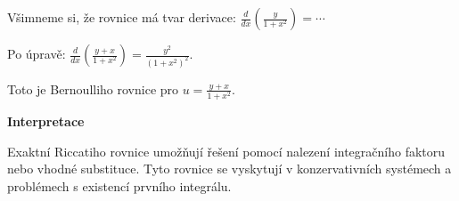 \begin{example}
        Všimneme si, že rovnice má tvar derivace: $\frac{d}{dx}\left(\frac{y}{1 + x^2}\right) = \cdots$
        
        Po úpravě: $\frac{d}{dx}\left(\frac{y + x}{1 + x^2}\right) = \frac{y^2}{(1 + x^2)^2}$.
        
        Toto je Bernoulliho rovnice pro $u = \frac{y + x}{1 + x^2}$.
        
        \vspace{1.5\baselineskip}
        
        \noindent\textbf{Interpretace}
        
        Exaktní Riccatiho rovnice umožňují řešení pomocí nalezení integračního faktoru 
        nebo vhodné substituce. Tyto rovnice se vyskytují v konzervativních systémech 
        a problémech s existencí prvního integrálu.
        
        \end{example}
        
        \vspace{2\baselineskip}
        

